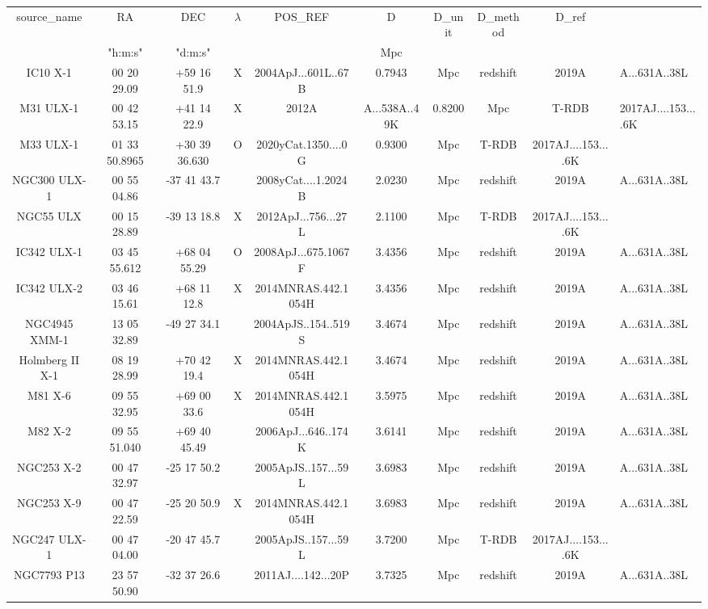 \begin{table}
\begin{tabular}{ccccccccc}
source_name & RA & DEC & $\lambda$ & POS_REF & D & D_unit & D_method & D_ref \\
 & "h:m:s" & "d:m:s" &  &  & $\mathrm{Mpc}$ &  &  &  \\
IC10 X-1 & 00 20 29.09 & +59 16 51.9 & X & 2004ApJ...601L..67B & 0.7943 & Mpc & redshift & 2019A&A...631A..38L \\
M31 ULX-1 & 00 42 53.15 & +41 14 22.9 & X & 2012A&A...538A..49K & 0.8200 & Mpc & T-RDB & 2017AJ....153....6K \\
M33 ULX-1 & 01 33 50.8965 & +30 39 36.630 & O & 2020yCat.1350....0G & 0.9300 & Mpc & T-RDB & 2017AJ....153....6K \\
NGC300 ULX-1 & 00 55 04.86 & -37 41 43.7 &  & 2008yCat....1.2024B & 2.0230 & Mpc & redshift & 2019A&A...631A..38L \\
NGC55 ULX & 00 15 28.89 & -39 13 18.8 & X & 2012ApJ...756...27L & 2.1100 & Mpc & T-RDB & 2017AJ....153....6K \\
IC342 ULX-1 & 03 45 55.612 & +68 04 55.29 & O & 2008ApJ...675.1067F & 3.4356 & Mpc & redshift & 2019A&A...631A..38L \\
IC342 ULX-2 & 03 46 15.61 & +68 11 12.8 & X & 2014MNRAS.442.1054H & 3.4356 & Mpc & redshift & 2019A&A...631A..38L \\
NGC4945 XMM-1 & 13 05 32.89 & -49 27 34.1 &  & 2004ApJS..154..519S & 3.4674 & Mpc & redshift & 2019A&A...631A..38L \\
Holmberg II X-1 & 08 19 28.99 & +70 42 19.4 & X & 2014MNRAS.442.1054H & 3.4674 & Mpc & redshift & 2019A&A...631A..38L \\
M81 X-6 & 09 55 32.95 & +69 00 33.6 & X & 2014MNRAS.442.1054H & 3.5975 & Mpc & redshift & 2019A&A...631A..38L \\
M82 X-2 & 09 55 51.040 & +69 40 45.49 &  & 2006ApJ...646..174K & 3.6141 & Mpc & redshift & 2019A&A...631A..38L \\
NGC253 X-2 & 00 47 32.97 & -25 17 50.2 &  & 2005ApJS..157...59L & 3.6983 & Mpc & redshift & 2019A&A...631A..38L \\
NGC253 X-9 & 00 47 22.59 & -25 20 50.9 & X & 2014MNRAS.442.1054H & 3.6983 & Mpc & redshift & 2019A&A...631A..38L \\
NGC247 ULX-1 & 00 47 04.00 & -20 47 45.7 &  & 2005ApJS..157...59L & 3.7200 & Mpc & T-RDB & 2017AJ....153....6K \\
NGC7793 P13 & 23 57 50.90 & -32 37 26.6 &  & 2011AJ....142...20P & 3.7325 & Mpc & redshift & 2019A&A...631A..38L \\

\end{tabular}
\end{table}
